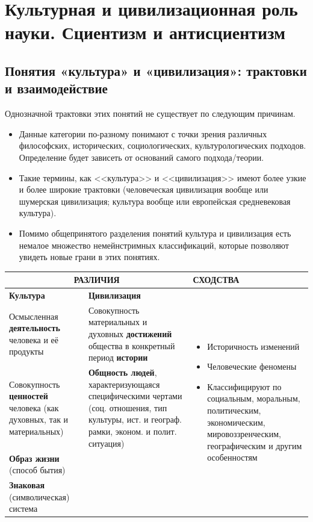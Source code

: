 \section{Культурная и цивилизационная роль науки. Сциентизм и антисциентизм}

\subsection{Понятия «культура» и «цивилизация»: трактовки и взаимодействие}

Однозначной трактовки этих понятий не существует по следующим причинам. 
\begin{itemize}
    \item Данные категории по-разному понимают с точки
    зрения различных философских, исторических, социологических, культурологических подходов.
    Определение будет зависеть от оснований самого подхода/теории.
    \item Такие термины, как <<культура>> и <<цивилизация>> имеют более узкие и 
    более широкие трактовки (человеческая цивилизация вообще  
    или шумерская цивилизация; культура вообще или европейская средневековая культура).
    \item Помимо общепринятого разделения понятий культура и цивилизация есть немалое
    множество немейнстримных классификаций, которые позволяют увидеть новые грани 
    в этих понятиях.
\end{itemize}

\begin{table}[H]
\centering
\renewcommand{\arraystretch}{1.5}
\begin{tabular}{|p{4cm}|p{4cm}|p{5cm}|}
\hline
\multicolumn{2}{|c|}{\textbf{РАЗЛИЧИЯ}} & \textbf{СХОДСТВА} \\ \hline
\textbf{Культура} & \textbf{Цивилизация} &
\multirow{5}{4cm}{\begin{itemize}
    \item Историчность изменений
    \item Человеческие феномены
    \item Классифицируют по социальным, моральным, политическим, экономическим, мировоззренческим, географическим и другим особенностям
\end{itemize}} \\ \cline{1-2}
Осмысленная \textbf{деятельность} человека и её продукты &
Совокупность материальных и духовных \textbf{достижений} общества в конкретный период \textbf{истории} & \\ \cline{1-2}
Совокупность \textbf{ценностей} человека (как духовных, так и
материальных) &
\textbf{Общность людей}, характеризующаяся специфическими чертами (соц. отношения, тип культуры, ист. и географ. рамки, эконом. и полит. ситуация) & \\ \cline{1-2}
\textbf{Образ жизни} (способ бытия) &
& \\ \cline{1-2}
\textbf{Знаковая} (символическая) система &
& \\ \hline
\end{tabular}
\label{table:culture_vs_civilization}
\end{table}

